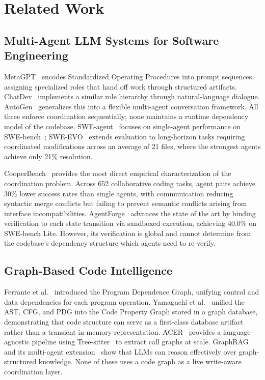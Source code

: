 \documentclass[12pt]{article}
\begin{document}
\section{Related Work}

\subsection{Multi-Agent LLM Systems for Software Engineering}

MetaGPT~\cite{hong2024metagpt} encodes Standardized Operating Procedures into
prompt sequences, assigning specialized roles that hand off work through structured
artifacts. ChatDev~\cite{qian2024chatdev} implements a similar role hierarchy
through natural-language dialogue. AutoGen~\cite{wu2023autogen} generalizes this
into a flexible multi-agent conversation framework. All three enforce coordination
sequentially; none maintains a runtime dependency model of the codebase.
SWE-agent~\cite{yang2024sweagent} focuses on single-agent performance on
SWE-bench~\cite{jimenez2024swebench}; SWE-EVO~\cite{thai2025sweevo} extends
evaluation to long-horizon tasks requiring coordinated modifications across an
average of 21 files, where the strongest agents achieve only 21\% resolution.

CooperBench~\cite{khatua2026cooperbench} provides the most direct empirical
characterization of the coordination problem. Across 652 collaborative coding
tasks, agent pairs achieve 30\% lower success rates than single agents, with
communication reducing syntactic merge conflicts but failing to prevent semantic
conflicts arising from interface incompatibilities.
AgentForge~\cite{kumar2026agentforge} advances the state of the art by binding
verification to each state transition via sandboxed execution, achieving 40.0\%
on SWE-bench Lite. However, its verification is global and cannot determine
from the codebase's dependency structure which agents need to re-verify.

\subsection{Graph-Based Code Intelligence}

Ferrante et al.~\cite{ferrante1987pdg} introduced the Program Dependence Graph,
unifying control and data dependencies for each program operation.
Yamaguchi et al.~\cite{yamaguchi2014cpg} unified the AST, CFG, and PDG into the
Code Property Graph stored in a graph database, demonstrating that code structure
can serve as a first-class database artifact rather than a transient in-memory
representation. ACER~\cite{chen2023acer} provides a language-agnostic pipeline
using Tree-sitter~\cite{utkin2022parsers} to extract call graphs at scale.
GraphRAG~\cite{edge2024graphrag} and its multi-agent
extension~\cite{gusarov2025multiagentgraphrag} show that LLMs can reason
effectively over graph-structured knowledge. None of these uses a code graph
as a live write-aware coordination layer.
\end{document}
